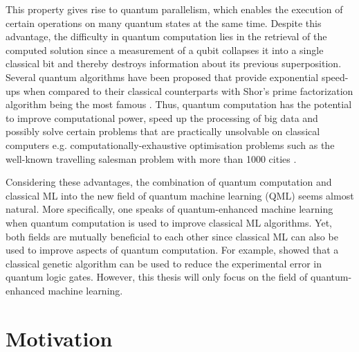 This property gives rise to quantum parallelism, which enables the execution of certain operations on many quantum states at the same time. Despite this advantage, the difficulty in quantum computation lies in the retrieval of the computed solution since a measurement of a qubit collapses it into a single classical bit and thereby destroys information about its previous superposition. Several quantum algorithms have been proposed that provide exponential speed-ups when compared to their classical counterparts with Shor's prime factorization algorithm being the most famous \cite{shor1994}.
Thus, quantum computation has the potential to improve computational power, speed up the processing of big data and possibly solve certain problems that are practically unsolvable on classical computers e.g. computationally-exhaustive optimisation problems such as the well-known travelling salesman problem with more than 1000 cities \cite{kieu2006quantum}.


Considering these advantages, the combination of quantum computation and classical ML into the new field of quantum machine learning (QML) seems almost natural. More specifically, one speaks of quantum-enhanced machine learning when quantum computation is used to improve classical ML algorithms. Yet, both fields are mutually beneficial to each other since classical ML can also be used to improve aspects of quantum computation. For example,  showed that a classical genetic algorithm can be used to reduce the experimental error in quantum logic gates. However, this thesis will only focus on the field of quantum-enhanced machine learning.


\section{Motivation}
\label{sec:motivation}

